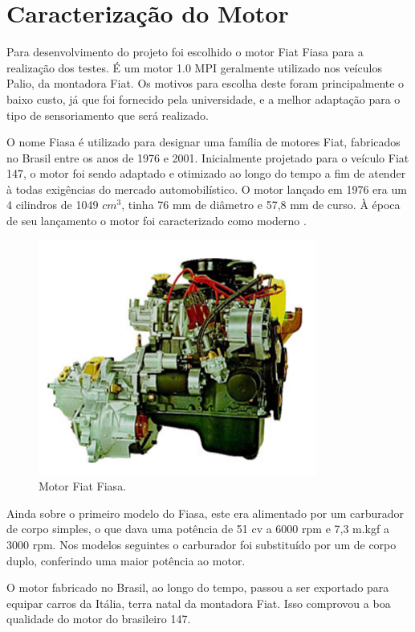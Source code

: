 \section{Caracterização do Motor}

	Para desenvolvimento do projeto foi escolhido o motor Fiat Fiasa para a realização dos testes. É um motor 1.0 MPI geralmente utilizado nos veículos Palio, da montadora Fiat. Os motivos para escolha deste foram principalmente o baixo custo, já que foi fornecido pela universidade, e a melhor adaptação para o tipo de sensoriamento que será realizado.
	
	O nome Fiasa é utilizado para designar uma família de motores Fiat, fabricados no Brasil entre os anos de 1976 e 2001. Inicialmente projetado para o veículo Fiat 147, o motor foi sendo adaptado e otimizado ao longo do tempo a fim de atender à todas exigências do mercado automobilístico. O motor lançado em 1976 era um 4 cilindros de 1049 $cm^3$, tinha 76 mm de diâmetro e 57,8 mm de curso. À época de seu lançamento o motor foi caracterizado como moderno \cite{dantas2012}.
	
\begin{figure}[h!]
	\centering
	\includegraphics[keepaspectratio=true,scale= 0.7]{figuras/motorfiat.png}
	\caption{Motor Fiat Fiasa.}
	\label{fig:motorfiat}
\end{figure}

	Ainda sobre o primeiro modelo do Fiasa, este era alimentado por um carburador de corpo simples, o que dava uma potência de 51 cv a 6000 rpm e 7,3 m.kgf a 3000 rpm. Nos modelos seguintes o carburador foi substituído por um de corpo duplo, conferindo uma maior potência ao motor.
	
	O motor fabricado no Brasil, ao longo do tempo, passou a ser exportado para equipar carros da Itália, terra natal da montadora Fiat. Isso comprovou a boa qualidade do motor do brasileiro 147.
	
